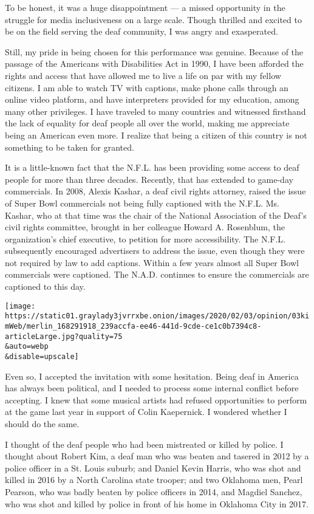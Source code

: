 To be honest, it was a huge disappointment --- a missed opportunity in
the struggle for media inclusiveness on a large scale. Though thrilled
and excited to be on the field serving the deaf community, I was angry
and exasperated.

Still, my pride in being chosen for this performance was genuine.
Because of the passage of the Americans with Disabilities Act in 1990, I
have been afforded the rights and access that have allowed me to live a
life on par with my fellow citizens. I am able to watch TV with
captions, make phone calls through an online video platform, and have
interpreters provided for my education, among many other privileges. I
have traveled to many countries and witnessed firsthand the lack of
equality for deaf people all over the world, making me appreciate being
an American even more. I realize that being a citizen of this country is
not something to be taken for granted.

It is a little-known fact that the N.F.L. has been providing some access
to deaf people for more than three decades. Recently, that has extended
to game-day commercials. In 2008, Alexis Kashar, a deaf civil rights
attorney, raised the issue of Super Bowl commercials not being fully
captioned with the N.F.L. Ms. Kashar, who at that time was the chair of
the National Association of the Deaf's civil rights committee, brought
in her colleague Howard A. Rosenblum, the organization's chief
executive, to petition for more accessibility. The N.F.L. subsequently
encouraged advertisers to address the issue, even though they were not
required by law to add captions. Within a few years almost all Super
Bowl commercials were captioned. The N.A.D. continues to ensure the
commercials are captioned to this day.

\texttt{[image: https://static01.graylady3jvrrxbe.onion/images/2020/02/03/opinion/03kimWeb/merlin\_168291918\_239accfa-ee46-441d-9cde-ce1c0b7394c8-articleLarge.jpg?quality=75\\\&auto=webp\\\&disable=upscale]}

Even so, I accepted the invitation with some hesitation. Being deaf in
America has always been political, and I needed to process some internal
conflict before accepting. I knew that some musical artists had refused
opportunities to perform at the game last year in support of Colin
Kaepernick. I wondered whether I should do the same.

I thought of the deaf people who had been mistreated or killed by
police. I thought about Robert Kim, a deaf man who was beaten and
tasered in 2012 by a police officer in a St. Louis suburb; and Daniel
Kevin Harris, who was shot and killed in 2016 by a North Carolina state
trooper; and two Oklahoma men, Pearl Pearson, who was badly beaten by
police officers in 2014, and Magdiel Sanchez, who was shot and killed by
police in front of his home in Oklahoma City in 2017.

